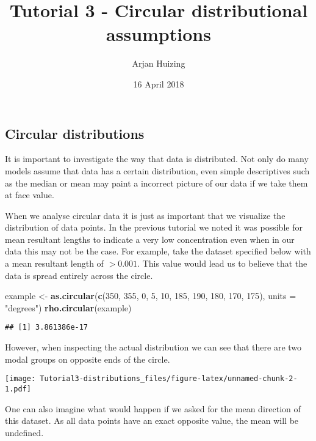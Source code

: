 \documentclass[]{article}
\title{Tutorial 3 - Circular distributional assumptions}
\author{Arjan Huizing}
\date{16 April 2018}
\newenvironment{Shaded}{\begin{snugshade}}{\end{snugshade}}
\newcommand{\KeywordTok}[1]{\textcolor[rgb]{0.13,0.29,0.53}{\textbf{#1}}}
\newcommand{\DataTypeTok}[1]{\textcolor[rgb]{0.13,0.29,0.53}{#1}}
\newcommand{\DecValTok}[1]{\textcolor[rgb]{0.00,0.00,0.81}{#1}}
\newcommand{\StringTok}[1]{\textcolor[rgb]{0.31,0.60,0.02}{#1}}
\newcommand{\NormalTok}[1]{#1}
\begin{document}
\maketitle

\subsection{Circular distributions}\label{circular-distributions}

It is important to investigate the way that data is distributed. Not
only do many models assume that data has a certain distribution, even
simple descriptives such as the median or mean may paint a incorrect
picture of our data if we take them at face value.

When we analyse circular data it is just as important that we visualize
the distribution of data points. In the previous tutorial we noted it
was possible for mean resultant lengths to indicate a very low
concentration even when in our data this may not be the case. For
example, take the dataset specified below with a mean resultant length
of \(>0.001\). This value would lead us to believe that the data is
spread entirely across the circle.

\begin{Shaded}
\begin{Highlighting}[]
\NormalTok{example <-}\StringTok{ }\KeywordTok{as.circular}\NormalTok{(}\KeywordTok{c}\NormalTok{(}\DecValTok{350}\NormalTok{, }\DecValTok{355}\NormalTok{, }\DecValTok{0}\NormalTok{, }\DecValTok{5}\NormalTok{, }\DecValTok{10}\NormalTok{, }
                         \DecValTok{185}\NormalTok{, }\DecValTok{190}\NormalTok{, }\DecValTok{180}\NormalTok{, }\DecValTok{170}\NormalTok{, }\DecValTok{175}\NormalTok{), }\DataTypeTok{units =} \StringTok{"degrees"}\NormalTok{)}
\KeywordTok{rho.circular}\NormalTok{(example)}
\end{Highlighting}
\end{Shaded}

\begin{verbatim}
## [1] 3.861386e-17
\end{verbatim}

However, when inspecting the actual distribution we can see that there
are two modal groups on opposite ends of the circle.

\texttt{[image: Tutorial3-distributions\_files/figure-latex/unnamed-chunk-2-1.pdf]}

One can also imagine what would happen if we asked for the mean
direction of this dataset. As all data points have an exact opposite
value, the mean will be undefined.
\end{document}
